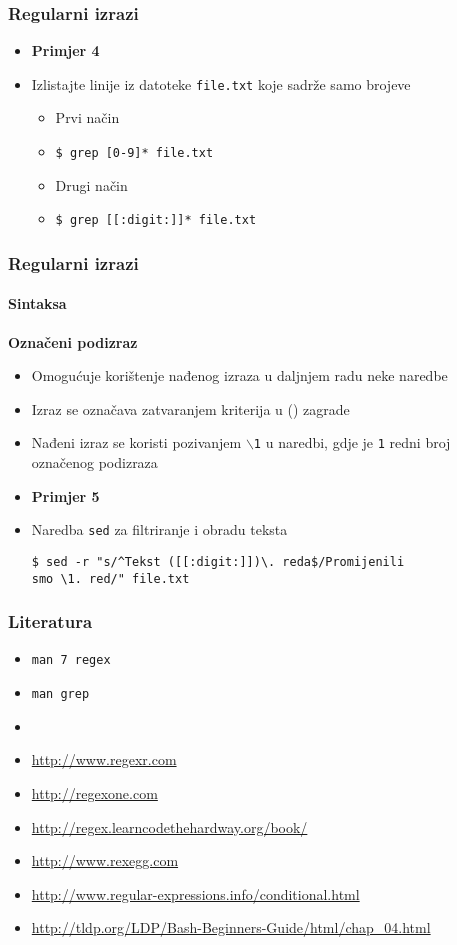 \documentclass[table,usenames,dvipsnames]{beamer}
\newcommand{\shell}[1]{\texttt{#1}}
\begin{document}
\begin{frame}[t]
\frametitle{Regularni izrazi}
\begin{itemize}
\item \textbf{Primjer 4}
\item[] Izlistajte linije iz datoteke \shell{file.txt} koje sadrže samo brojeve
\begin{itemize}
	\item Prvi način
	\item[] \shell{\$ grep [0-9]* file.txt}
	\item Drugi način
	\item[] \shell{\$ grep [[:digit:]]* file.txt}
\end{itemize}
\end{itemize}
\end{frame}

\begin{frame}[fragile]
\frametitle{Regularni izrazi}
\framesubtitle{Sintaksa}
\textbf{Označeni podizraz}
\begin{itemize}
	\item Omogućuje korištenje nađenog izraza u daljnjem radu neke naredbe
	\item Izraz se označava zatvaranjem kriterija u () zagrade
	\item Nađeni izraz se koristi pozivanjem \shell{$\backslash$1} u naredbi, gdje je \shell{1} redni broj označenog podizraza
\end{itemize}
\vfill
\begin{itemize}
\item \textbf{Primjer 5}
\item[] Naredba \shell{sed} za filtriranje i obradu teksta
\small \begin{verbatim}$ sed -r "s/^Tekst ([[:digit:]])\. reda$/Promijenili 
smo \1. red/" file.txt\end{verbatim}
\end{itemize}
\vfill
\end{frame}


\begin{frame}[t]
\frametitle{Literatura}
\begin{itemize}
	\item[] \shell{man 7 regex}
	\item[] \shell{man grep}
	\item[]
  \item[] \small\url{http://www.regexr.com}
  \item[] \small\url{http://regexone.com}
  \item[] \small\url{http://regex.learncodethehardway.org/book/}
  \item[] \small\url{http://www.rexegg.com}
  \item[] \small\url{http://www.regular-expressions.info/conditional.html} 
  \item[] \small\url{http://tldp.org/LDP/Bash-Beginners-Guide/html/chap_04.html}
\end{itemize}
\end{frame}
\end{document}

